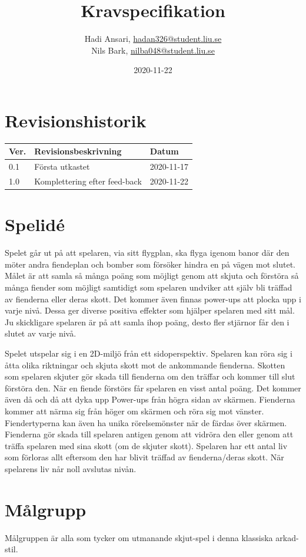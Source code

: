\documentclass{TDP005mall}
\author{Hadi Ansari, \url{hadan326@student.liu.se}\\
  Nils Bark, \url{nilba048@student.liu.se}}
\title{Kravspecifikation}
\date{2020-11-22}
\begin{document}
\projectpage
\tableofcontents
\thispagestyle{empty}
\cleardoublepage

\section{Revisionshistorik}
\begin{table}[!h]
\begin{tabularx}{\linewidth}{|l|X|l|}
\hline
Ver. & Revisionsbeskrivning & Datum \\\hline
0.1 & Första utkastet & 2020-11-17 \\\hline
1.0 & Komplettering efter feed-back& 2020-11-22 \\\hline

\end{tabularx}
\end{table}


\section{Spelidé}
Spelet går ut på att spelaren, via sitt flygplan, ska flyga igenom banor där den möter andra fiendeplan och bomber som försöker hindra en på vägen mot slutet. 
Målet är att samla så många poäng som möjligt genom att skjuta och förstöra så många fiender som möjligt samtidigt som spelaren undviker att själv bli träffad av fienderna eller deras skott.
Det kommer även finnas power-ups att plocka upp i varje nivå. Dessa ger diverse positiva effekter som hjälper spelaren med sitt mål. Ju skickligare spelaren är på att samla ihop poäng, desto fler stjärnor får den i slutet av varje nivå.

Spelet utspelar sig i en 2D-miljö från ett sidoperspektiv. Spelaren kan röra sig i åtta olika
riktningar och skjuta skott mot de ankommande fienderna. Skotten som spelaren skjuter gör
skada till fienderna om den träffar och kommer till slut förstöra den. När en fiende förstörs
får spelaren en visst antal poäng. Det kommer även då och då att dyka upp Power-ups från högra sidan av skärmen. 
Fienderna kommer att närma sig från höger om skärmen och röra sig mot vänster. 
Fiendertyperna kan även ha unika rörelsemönster när de färdas över skärmen. 
Fienderna gör skada till spelaren antigen genom att vidröra den
eller genom att träffa spelaren med sina skott (om de skjuter skott). 
Spelaren har ett antal liv som förloras allt eftersom den har blivit träffad av fienderna/deras skott.
När spelarens liv når noll avslutas nivån.

\section{Målgrupp}
Målgruppen är alla som tycker om utmanande skjut-spel i denna klassiska arkad-stil.
\end{document}
